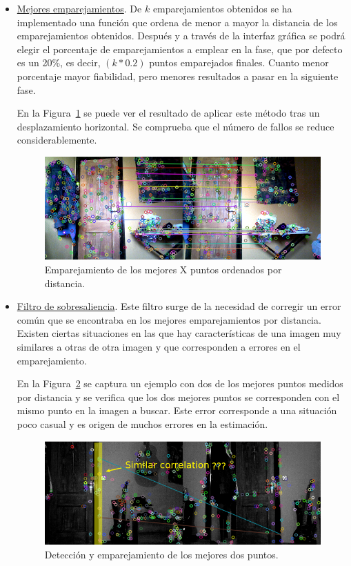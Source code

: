 \begin{itemize}
\item \underline{Mejores emparejamientos}. De $k$ emparejamientos obtenidos se ha implementado una función que ordena de menor a mayor la distancia de los emparejamientos obtenidos. Después y a través de la interfaz gráfica se podrá elegir el porcentaje de emparejamientos a emplear en la fase, que por defecto es un 20\%, es decir, $(k*0.2)$ puntos emparejados finales. Cuanto menor porcentaje mayor fiabilidad, pero menores resultados a pasar en la siguiente fase.

En la Figura~\ref{fig:bestPointsSift} se puede ver el resultado de aplicar este método tras un desplazamiento horizontal. Se comprueba que el número de fallos se reduce considerablemente.

\begin{figure}[th]
\centering
\includegraphics[scale=0.6]{Figures/best_points_sift.png}
\decoRule
\caption[Captura de los mejores puntos con SIFT]{Emparejamiento de los mejores X puntos ordenados por distancia.}
\label{fig:bestPointsSift}
\end{figure}

\item \underline{Filtro de sobresaliencia}. Este filtro surge de la necesidad de corregir un error común que se encontraba en los mejores emparejamientos por distancia. Existen ciertas situaciones en las que hay características de una imagen muy similares a otras de otra imagen y que corresponden a errores en el emparejamiento.

En la Figura~\ref{fig:similarCorrelation} se captura un ejemplo con dos de los mejores puntos medidos por distancia y se verifica que los dos mejores puntos se corresponden con el mismo punto en la imagen a buscar. Este error corresponde a una situación poco casual y es origen de muchos errores en la estimación.

\begin{figure}[th]
\centering
\includegraphics[scale=0.6]{Figures/similar-correlation.png}
\decoRule
\caption[Captura con error de los dos mejores puntos en SIFT]{Detección y emparejamiento de los mejores dos puntos.}
\label{fig:similarCorrelation}
\end{figure}


\end{itemize}
